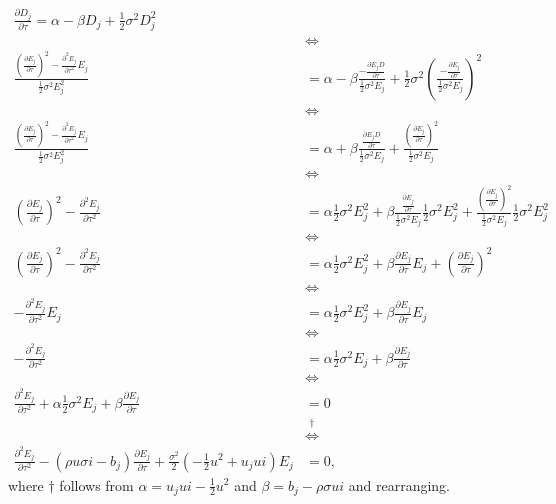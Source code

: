 \documentclass[11pt]{article}
\numberwithin{equation}{section}
\begin{document}
\begin{align*}
    \frac{\partial D_j}{\partial \tau}=\alpha-\beta D_j + \frac{1}{2}\sigma^2D_j^2\\
    &\iff\\
    \frac{\left ( \frac{\partial E_j}{\partial \tau}\right )^2-\frac{\partial^2 E_j}{\partial\tau^2 }E_j}{\frac{1}{2}\sigma^2 E_j^2}&=\alpha-\beta\frac{-\frac{\partial E_jD}{\partial \tau}}{\frac{1}{2}\sigma^2 E_j}+\frac{1}{2}\sigma^2 \left ( \frac{-\frac{\partial E_j}{\partial \tau}}{\frac{1}{2}\sigma^2 E_j}\right )^2\\
    &\iff\\
    \frac{\left ( \frac{\partial E_j}{\partial \tau}\right )^2-\frac{\partial^2 E_j}{\partial\tau^2 }E_j}{\frac{1}{2}\sigma^2 E_j^2}&=\alpha+\beta\frac{\frac{\partial E_jD}{\partial \tau}}{\frac{1}{2}\sigma^2 E_j}+ \frac{\left ( \frac{\partial E_j}{\partial \tau}\right ) ^2}{\frac{1}{2}\sigma^2 E_j}\\
    &\iff\\
    \left ( \frac{\partial E_j}{\partial \tau} \right )^2 - \frac{\partial^2 E_j}{\partial \tau^2} &= \alpha \frac{1}{2} \sigma^2 E_j^2 + \beta \frac{ \frac{\partial E_j}{\partial \tau} }{\frac{1}{2}\sigma^2E_j} \frac{1}{2}\sigma^2 E_j^2+ \frac{\left ( \frac{\partial E_j}{\partial \tau}\right ) ^2}{\frac{1}{2}\sigma^2 E_j}\frac{1}{2}\sigma^2 E_j^2\\
    &\iff\\
    \left ( \frac{\partial E_j}{\partial \tau} \right )^2 - \frac{\partial^2 E_j}{\partial \tau^2} &= \alpha \frac{1}{2} \sigma^2 E_j^2 + \beta \frac{\partial E_j}{\partial \tau}E_j+\left ( \frac{\partial E_j }{\partial \tau} \right )^2\\
    &\iff\\
    - \frac{\partial^2 E_j}{\partial \tau^2}E_j &= \alpha \frac{1}{2} \sigma^2 E_j^2 + \beta \frac{\partial E_j}{\partial \tau}E_j\\
    &\iff\\
    - \frac{\partial^2 E_j}{\partial \tau^2} &= \alpha \frac{1}{2} \sigma^2 E_j + \beta \frac{\partial E_j}{\partial \tau}\\
    &\iff\\
    \frac{\partial^2 E_j}{\partial \tau^2}+\alpha \frac{1}{2} \sigma^2 E_j + \beta \frac{\partial E_j}{\partial \tau}&=0\\
    &\overset{\dagger}{\iff}\\
    \frac{\partial^2 E_j}{\partial \tau^2} - (\rho u \sigma i - b_j) \frac{\partial E_j}{\partial \tau} + \frac{\sigma^2}{2} \left( -\frac{1}{2}u^2 + u_j ui \right) E_j &= 0,
\end{align*}
where $\dagger$ follows from $\alpha = u_j ui - \frac{1}{2}u^2$ and
$\beta=b_j-\rho \sigma u i$ and rearranging.
\end{document}
